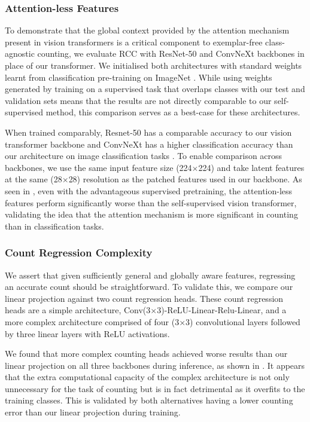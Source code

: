 \documentclass[../thesis.tex]{subfiles}
\begin{document}
\subsubsection{Attention-less Features}
To demonstrate that the global context provided by the attention mechanism present in vision transformers is a critical component to exemplar-free class-agnostic counting, we evaluate RCC with ResNet-50 \cite{he2016resnet} and ConvNeXt \cite{liu2022convnext} backbones in place of our transformer. 
We initialised both architectures with standard weights learnt from classification pre-training on ImageNet \cite{deng2009imagenet}. 
While using weights generated by training on a supervised task that overlaps classes with our test and validation sets means that the results are not directly comparable to our self-supervised method, this comparison serves as a best-case for these architectures.

When trained comparably, Resnet-50 has a comparable accuracy to our vision transformer backbone and ConvNeXt has a higher classification accuracy than our architecture on image classification tasks  \cite{liu2022convnext}.
To enable comparison across backbones, we use the same input feature size (224$\times$224) and take latent features at the same (28$\times$28) resolution as the patched features used in our backbone. 
As seen in , even with the advantageous supervised pretraining, the attention-less features perform significantly worse than the self-supervised vision transformer, validating the idea that the attention mechanism is more significant in counting than in classification tasks.


\subsubsection{Count Regression Complexity}
We assert that given sufficiently general and globally aware features, regressing an accurate count should be straightforward. To validate this, we compare our linear projection against two count regression heads. These count regression heads are a simple architecture, Conv(3$\times$3)-ReLU-Linear-Relu-Linear, and a more complex architecture comprised of four (3$\times$3) convolutional layers followed by three linear layers with ReLU activations.

We found that more complex counting heads achieved worse results than our linear projection on all three backbones during inference, as shown in . 
It appears that the extra computational capacity of the complex architecture is not only unnecessary for the task of counting but is in fact detrimental as it overfits to the training classes. This is validated by both alternatives having a lower counting error than our linear projection during training.
\end{document}
